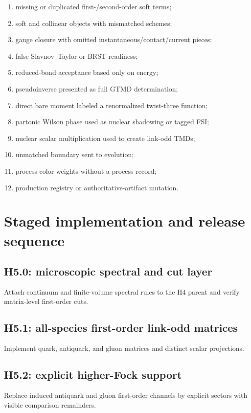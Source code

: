 \documentclass[11pt]{article}
\begin{document}
\begin{enumerate}
 \item missing or duplicated first-/second-order soft terms;
 \item soft and collinear objects with mismatched schemes;
 \item gauge closure with omitted instantaneous/contact/current pieces;
 \item false Slavnov--Taylor or BRST readiness;
 \item reduced-bond acceptance based only on energy;
 \item pseudoinverse presented as full GTMD determination;
 \item direct bare moment labeled a renormalized twist-three function;
 \item partonic Wilson phase used as nuclear shadowing or tagged FSI;
 \item nuclear scalar multiplication used to create link-odd TMDs;
 \item unmatched boundary sent to evolution;
 \item process color weights without a process record;
 \item production registry or authoritative-artifact mutation.
\end{enumerate}

\section{Staged implementation and release sequence}
\label{sec:stages}

\subsection{H5.0: microscopic spectral and cut layer}
Attach continuum and finite-volume spectral rules to the H4 parent and verify
matrix-level first-order cuts.

\subsection{H5.1: all-species first-order link-odd matrices}
Implement quark, antiquark, and gluon matrices and distinct scalar
projections.

\subsection{H5.2: explicit higher-Fock support}
Replace induced antiquark and gluon first-order channels by explicit sectors
with visible comparison remainders.
\end{document}
